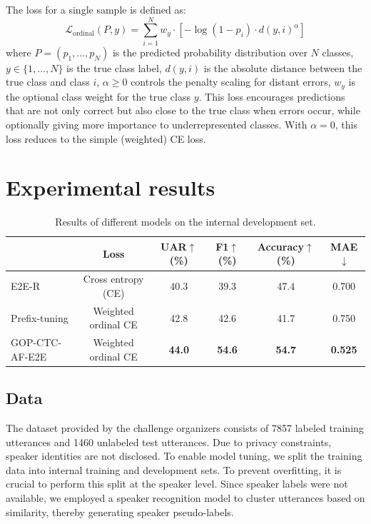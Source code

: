 \documentclass{article}
\begin{document}
The loss for a single sample is defined as:
\[
\mathcal{L}_{\text{ordinal}}(P, y) = \sum_{i=1}^{N} w_y \cdot \left[ -\log(1 - p_i) \cdot d(y, i)^\alpha \right]
\]
where  \( P = (p_1, \dots, p_N) \) is the predicted probability distribution over \( N \) classes, \(y \in \{1, \dots, N\}\) is the true class label,
\( d(y, i) \) is the absolute distance between the true class and class \( i \),
 \( \alpha \geq 0 \) controls the penalty scaling for distant errors,
 \( w_y \) is the optional class weight for the true class \( y \).
 This loss encourages predictions that are not only correct but also close to the true class when errors occur, while optionally giving more importance to underrepresented classes. With $\alpha = 0$, this loss reduces to the simple (weighted) CE loss.

\section{Experimental results}

\begin{table}[tb]
\centering
\label{tab:dev-results}
\caption{Results of different models on the internal development set.}
\begin{tabular}{l|c|cccc}
\toprule
              & Loss                &UAR$\uparrow$  (\%)  & F1$\uparrow$ (\%) & Accuracy$\uparrow$ (\%) & MAE$\downarrow$   \\ \midrule
E2E-R         & Cross entropy (CE)  & 40.3      & 39.3    & 47.4          & 0.700     \\
Prefix-tuning & Weighted ordinal CE & 42.8      & 42.6    & 41.7          & 0.750     \\
GOP-CTC-AF-E2E    & Weighted ordinal CE & \textbf{44.0}      & \textbf{54.6}    &\textbf{ 54.7}          & \textbf{0.525}     \\ \bottomrule
\end{tabular}
\end{table}


\subsection{Data}


The dataset provided by the challenge organizers consists of 7857 labeled training utterances and 1460 unlabeled test utterances. Due to privacy constraints, speaker identities are not disclosed. To enable model tuning, we split the training data into internal training and development sets. To prevent overfitting, it is crucial to perform this split at the speaker level. Since speaker labels were not available, we employed a speaker recognition model to cluster utterances based on similarity, thereby generating speaker pseudo-labels.
\end{document}
